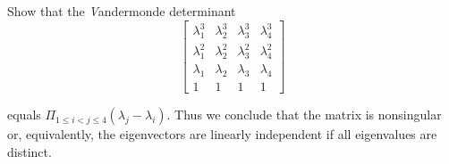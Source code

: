 \item [3.15] Show that the \emph Vandermonde determinant
\begin{equation*}
 \begin{bmatrix}
  \lambda_1^3 & \lambda_2^3 & \lambda_3^3 & \lambda_4^3 \\
  \lambda_1^2 & \lambda_2^2 & \lambda_3^2 & \lambda_4^2 \\
  \lambda_1 & \lambda_2 & \lambda_3 & \lambda_4 \\
  1 & 1 & 1 & 1
 \end{bmatrix}
\end{equation*}

equals $ \Pi_{1 \leq i < j \leq 4} (\lambda_j - \lambda_i)$.
Thus we conclude that the matrix is nonsingular or, equivalently, the eigenvectors are linearly independent if all eigenvalues are distinct.
